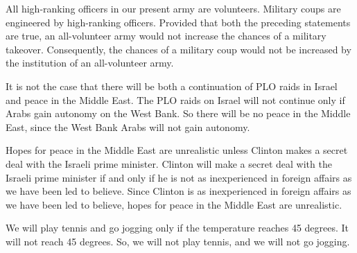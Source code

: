 \begin{enumerate}
	\begin{statement} { All high-ranking officers in our present army are
			volunteers. Military coups are engineered by high-ranking officers. Provided
			that both the preceding statements are true, an all-volunteer army would not
			increase the chances of a military takeover. Consequently, the chances of a
			military coup would not be increased by the institution of an all-volunteer
			army.}
	\end{statement}

	\begin{statement} {It is not the case that there will be both a continuation of PLO raids in Israel
			and peace in the Middle East. The PLO raids on Israel will not continue only if
			Arabs gain autonomy on the West Bank. So there will be no peace in the Middle
			East, since the West Bank Arabs will not gain autonomy.}
	\end{statement}

	\begin{statement} {Hopes for peace in the Middle East are unrealistic unless Clinton makes a secret
			deal with the Israeli prime minister. Clinton will make a secret deal with the
			Israeli prime minister if and only if he is not as inexperienced in foreign
			affairs as we have been led to believe. Since Clinton is as inexperienced in
			foreign affairs as we have been led to believe, hopes for peace in the Middle
			East are unrealistic.}
	\end{statement}

	\begin{statement} {We will play tennis and go jogging only if the temperature
			reaches 45 degrees. It will not reach 45 degrees. So, we will not play
			tennis, and we will not go jogging.}
	\end{statement}


\end{enumerate}
